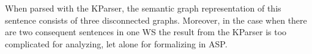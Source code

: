 When parsed with the KParser, the semantic graph representation of this sentence consists of three disconnected graphs. Moreover, in the case when there are two consequent sentences in one WS the result from the KParser is too complicated for analyzing, let alone for formalizing in ASP. 




\begin{comment}

However, there are limits to how far the idea of/co
ncept of X can be taken. 
\begin{itemize}
	\item what was difficult to do, or discover (ex:classifying the sentences; identifying the different categories)
	\item what was interesting, challenging
	\item what's missing; didn't do (my own reasoner)
	\item How my framework relates to other approaches
\end{itemize}

Hence, identifying the category of an input WSC sentence can be essential for obtaining the correct answer.


\end{comment}
